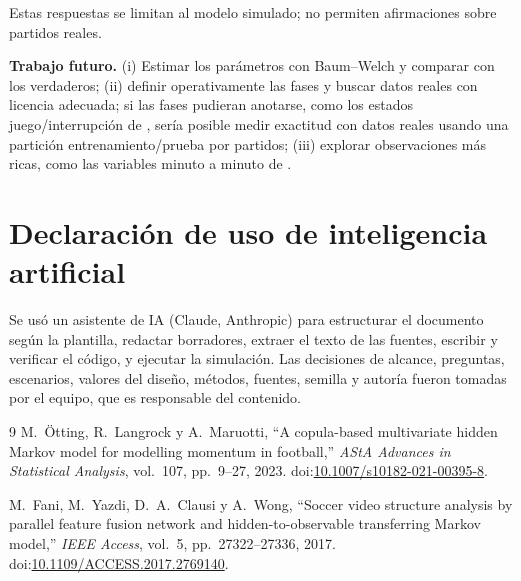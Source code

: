 \documentclass[11pt,a4paper]{article}
\begin{document}
Estas respuestas se limitan al modelo simulado; no permiten afirmaciones sobre
partidos reales.

\textbf{Trabajo futuro.} (i) Estimar los parámetros con Baum--Welch y comparar
con los verdaderos; (ii) definir operativamente las fases y buscar datos reales
con licencia adecuada; si las fases pudieran anotarse, como los estados
juego/interrupción de \cite{fani2017}, sería posible medir exactitud con datos
reales usando una partición entrenamiento/prueba por partidos; (iii) explorar observaciones más ricas, como las
variables minuto a minuto de \cite{otting2023}.

\section*{Declaración de uso de inteligencia artificial}
Se usó un asistente de
IA (Claude, Anthropic) para estructurar el documento según la plantilla,
redactar borradores, extraer el texto de las fuentes, escribir y verificar el
código, y ejecutar la simulación. Las decisiones de alcance, preguntas,
escenarios, valores del diseño, métodos, fuentes, semilla y autoría
fueron tomadas por el equipo, que es responsable del contenido.

\begin{thebibliography}{9}
M.~Ötting, R.~Langrock y A.~Maruotti, ``A copula-based multivariate hidden
Markov model for modelling momentum in football,'' \emph{AStA Advances in
Statistical Analysis}, vol.~107, pp.~9--27, 2023.
doi:\href{https://doi.org/10.1007/s10182-021-00395-8}{10.1007/s10182-021-00395-8}.

M.~Fani, M.~Yazdi, D.~A.~Clausi y A.~Wong, ``Soccer video structure analysis
by parallel feature fusion network and hidden-to-observable transferring Markov
model,'' \emph{IEEE Access}, vol.~5, pp.~27322--27336, 2017.
doi:\href{https://doi.org/10.1109/ACCESS.2017.2769140}{10.1109/ACCESS.2017.2769140}.
\end{thebibliography}

\appendix
\end{document}
